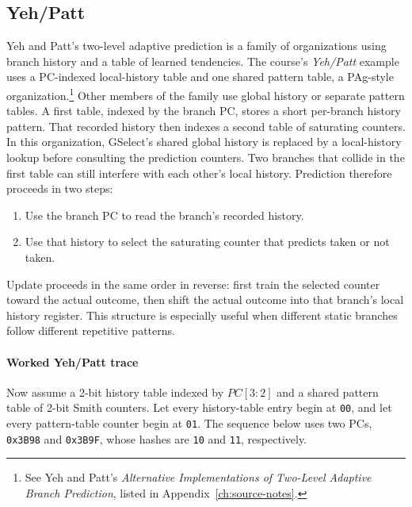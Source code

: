 \subsection{Yeh/Patt}\label{subsec:auto-010b}
Yeh and Patt's two-level adaptive prediction is a family of organizations using branch history and a table of learned tendencies.
The course's \textit{Yeh/Patt} example uses a PC-indexed local-history table and one shared pattern table, a PAg-style organization.\footnote{See Yeh and Patt's \emph{Alternative Implementations of Two-Level Adaptive Branch Prediction}, listed in Appendix~\ref{ch:source-notes}.}
Other members of the family use global history or separate pattern tables.
A first table, indexed by the branch PC, stores a short per-branch history pattern.
That recorded history then indexes a second table of saturating counters.
In this organization, GSelect's shared global history is replaced by a local-history lookup before consulting the prediction counters.
Two branches that collide in the first table can still interfere with each other's local history.
Prediction therefore proceeds in two steps:
\begin{enumerate}
    \item Use the branch PC to read the branch's recorded history.
    \item Use that history to select the saturating counter that predicts taken or not taken.
\end{enumerate}
Update proceeds in the same order in reverse: first train the selected counter toward the actual outcome, then shift the actual outcome into that branch's local history register.
This structure is especially useful when different static branches follow different repetitive patterns.

\paragraph{Worked Yeh/Patt trace}\label{par:pipe-yehpatt-worked}
Now assume a 2-bit history table indexed by $PC[3:2]$ and a shared pattern table of 2-bit Smith counters.
Let every history-table entry begin at \texttt{00}, and let every pattern-table counter begin at \texttt{01}.
The sequence below uses two PCs, \texttt{0x3B98} and \texttt{0x3B9F}, whose hashes are \texttt{10} and \texttt{11}, respectively.

